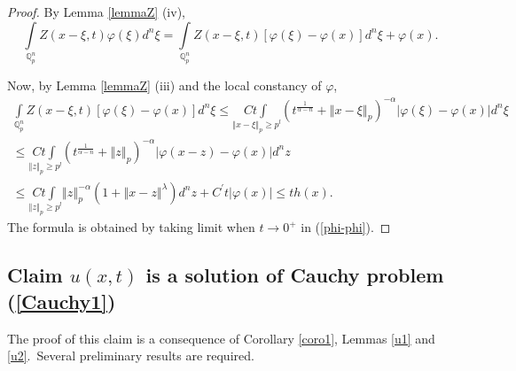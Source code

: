 \documentclass{amsart}\usepackage{amsfonts}
\theoremstyle{plain}
\numberwithin{equation}{section}
\begin{document}
\begin{proof}
By Lemma \ref{lemmaZ} (iv),\begin{equation}
\underset{\mathbb{Q}_{p}^{n}}{\int}Z(x-\xi,t)\varphi(\xi)d^{n}\xi
=\underset{\mathbb{Q}_{p}^{n}}{\int}Z(x-\xi,t)\left[  \varphi(\xi
)-\varphi(x)\right]  d^{n}\xi+\varphi(x). \label{phi-phi}\end{equation}


Now, by Lemma \ref{lemmaZ} (iii) and the local constancy of $\varphi$,
\begin{multline*}
\underset{\mathbb{Q}_{p}^{n}}{\int}Z(x-\xi,t)\left[  \varphi(\xi
)-\varphi(x)\right]  d^{n}\xi\leq\underset{\left\Vert x-\xi\right\Vert
_{p}\geq p^{l}}{Ct\int}(t^{\frac{1}{\alpha-n}}+\left\Vert x-\xi\right\Vert
_{p})^{-\alpha}\left\vert \varphi(\xi)-\varphi(x)\right\vert d^{n}\xi\\
\leq\underset{\left\Vert z\right\Vert _{p}\geq p^{l}}{Ct\int}(t^{\frac
{1}{\alpha-n}}+\left\Vert z\right\Vert _{p})^{-\alpha}\left\vert
\varphi(x-z)-\varphi(x)\right\vert d^{n}z\\
\leq\underset{\left\Vert z\right\Vert _{p}\geq p^{l}}{Ct\int}\left\Vert
z\right\Vert _{p}^{-\alpha}(1+\left\Vert x-z\right\Vert ^{\lambda})d^{n}z+C^{\prime}t\left\vert \varphi(x)\right\vert \leq th\left(  x\right)  .
\end{multline*}
The formula is obtained by taking limit when $t\rightarrow0^{+}$ in
(\ref{phi-phi}).
\end{proof}

\subsection{Claim $u(x,t)$ is a solution of Cauchy problem (\ref{Cauchy1})}

The proof of this claim is a consequence of Corollary \ref{coro1}, Lemmas
\ref{u1} and \ref{u2}.\ Several preliminary results are required.
\end{document}
